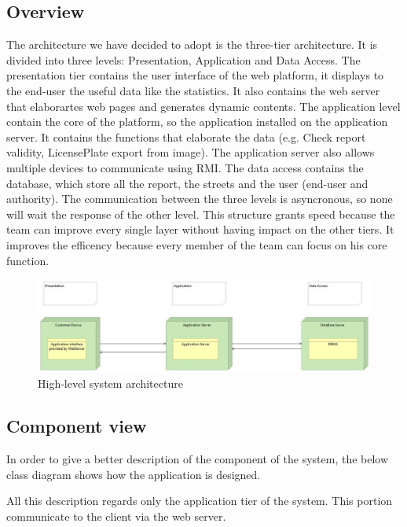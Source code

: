 \subsection{Overview}
The architecture we have decided to adopt is the three-tier architecture.
It is divided into three levels: Presentation, Application and Data Access.
The presentation tier contains the user interface of the web platform, it displays to the end-user the useful data like the statistics.
It also contains the web server that elaborartes web pages and generates dynamic contents.
The application level contain the core of the platform, so the application installed on the application server.
It contains the functions that elaborate the data (e.g. Check report validity, LicensePlate export from image).
The application server also allows multiple devices to communicate using RMI.
The data access contains the database, which store all the report, the streets and the user (end-user and authority).
The communication between the three levels is asyncronous, so none will wait the response of the other level.
This structure grants speed because the team can improve every single layer without having impact on the other tiers.
It improves the efficency because every member of the team can focus on his core function.

\begin{figure}
	
	\includegraphics[width=0.95\linewidth, height=0.20\textheight]{../DD/Images/architecture}
	\caption{High­‐level
		system
		architecture}
	\label{High­‐level
		system
		architecture}
\end{figure}

\newpage

\subsection{Component view}
In order to give a better description of the component of the system, the below class diagram shows how the application is designed.

All this description regards only the application tier of the system. This portion communicate to the client via the web server.

